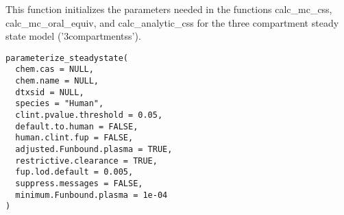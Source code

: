 \documentclass[a4paper]{book}
\begin{document}
%
\begin{Description}\relax
This function initializes the parameters needed in the functions
calc\_mc\_css, calc\_mc\_oral\_equiv, and calc\_analytic\_css for the three
compartment steady state model ('3compartmentss').
\end{Description}
%
\begin{Usage}
\begin{verbatim}
parameterize_steadystate(
  chem.cas = NULL,
  chem.name = NULL,
  dtxsid = NULL,
  species = "Human",
  clint.pvalue.threshold = 0.05,
  default.to.human = FALSE,
  human.clint.fup = FALSE,
  adjusted.Funbound.plasma = TRUE,
  restrictive.clearance = TRUE,
  fup.lod.default = 0.005,
  suppress.messages = FALSE,
  minimum.Funbound.plasma = 1e-04
)
\end{verbatim}
\end{Usage}
%
\end{document}
